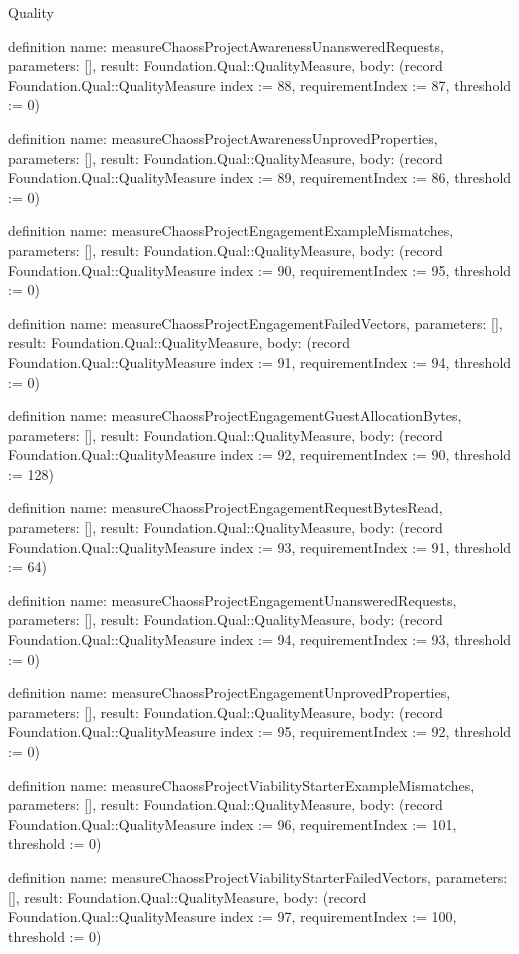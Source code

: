 \begin{lexlean}{Quality}
\begin{semanticmodule}
definition{
  name: measureChaossProjectAwarenessUnansweredRequests,
  parameters: [],
  result: Foundation.Qual::QualityMeasure,
  body: (record Foundation.Qual::QualityMeasure {index := 88, requirementIndex := 87, threshold := 0})
}

definition{
  name: measureChaossProjectAwarenessUnprovedProperties,
  parameters: [],
  result: Foundation.Qual::QualityMeasure,
  body: (record Foundation.Qual::QualityMeasure {index := 89, requirementIndex := 86, threshold := 0})
}

definition{
  name: measureChaossProjectEngagementExampleMismatches,
  parameters: [],
  result: Foundation.Qual::QualityMeasure,
  body: (record Foundation.Qual::QualityMeasure {index := 90, requirementIndex := 95, threshold := 0})
}

definition{
  name: measureChaossProjectEngagementFailedVectors,
  parameters: [],
  result: Foundation.Qual::QualityMeasure,
  body: (record Foundation.Qual::QualityMeasure {index := 91, requirementIndex := 94, threshold := 0})
}

definition{
  name: measureChaossProjectEngagementGuestAllocationBytes,
  parameters: [],
  result: Foundation.Qual::QualityMeasure,
  body: (record Foundation.Qual::QualityMeasure {index := 92, requirementIndex := 90, threshold := 128})
}

definition{
  name: measureChaossProjectEngagementRequestBytesRead,
  parameters: [],
  result: Foundation.Qual::QualityMeasure,
  body: (record Foundation.Qual::QualityMeasure {index := 93, requirementIndex := 91, threshold := 64})
}

definition{
  name: measureChaossProjectEngagementUnansweredRequests,
  parameters: [],
  result: Foundation.Qual::QualityMeasure,
  body: (record Foundation.Qual::QualityMeasure {index := 94, requirementIndex := 93, threshold := 0})
}

definition{
  name: measureChaossProjectEngagementUnprovedProperties,
  parameters: [],
  result: Foundation.Qual::QualityMeasure,
  body: (record Foundation.Qual::QualityMeasure {index := 95, requirementIndex := 92, threshold := 0})
}

definition{
  name: measureChaossProjectViabilityStarterExampleMismatches,
  parameters: [],
  result: Foundation.Qual::QualityMeasure,
  body: (record Foundation.Qual::QualityMeasure {index := 96, requirementIndex := 101, threshold := 0})
}

definition{
  name: measureChaossProjectViabilityStarterFailedVectors,
  parameters: [],
  result: Foundation.Qual::QualityMeasure,
  body: (record Foundation.Qual::QualityMeasure {index := 97, requirementIndex := 100, threshold := 0})
}


\end{semanticmodule}
\end{lexlean}
